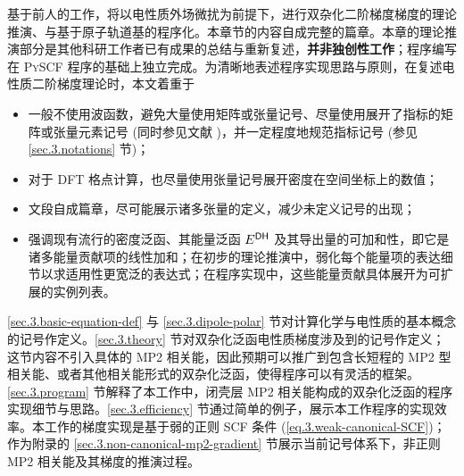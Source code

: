 基于前人的工作\cite{Gerratt-Mills.JCP.1968, Gerratt-Mills.JCP.1968a, Pople-Binkley.IJQC.1979, Dykstra-Jasien.CPL.1984, Handy-Schaefer.JCP.1984, Handy-Simandiras.CPL.1985, Pulay-Saeboe.TCA.1986, Trucks-Bartlett.CPL.1988, Frisch-Pople.CP.1990, Frisch-Pople.CPL.1990, Frisch-Pople.CPL.1990a, Gauss-Bartlett.JCP.1992, Stanton-Bartlett.CPL.1992, Johnson-Frisch.CPL.1993, Head-Gordon-Head-Gordon.CPL.1994, Yamaguchi-Schaefer.Oxford.1994, Weigend-Haeser.TCA.1997, Aikens-Gordon.TCA.2003, Cammi-Frisch.TCA.2004, Distasio-Head-Gordon.JCC.2007, Neese-Grimme.JCP.2007, Biczysko-Barone.JCTC.2010, Su-Xu.JCC.2013, Ji-Jung.JCTC.2013, Bykov-Neese.MP.2015, Stoychev-Neese.JCTC.2018, Yan-Xu.JCTC.2022}，将以电性质外场微扰为前提下，进行双杂化二阶梯度梯度的理论推演、与基于原子轨道基的程序化。本章节的内容自成完整的篇章。本章的理论推演部分是其他科研工作者已有成果的总结与重新复述，\textbf{并非独创性工作}；程序编写在 \textsc{PySCF} 程序的基础上独立完成。为清晰地表述程序实现思路与原则，在复述电性质二阶梯度理论时，本文着重于
\begin{itemize}[nosep]
    \item 一般不使用波函数，避免大量使用矩阵或张量记号、尽量使用展开了指标的矩阵或张量元素记号 (同时参见文献 )，并一定程度地规范指标记号 (参见 \ref{sec.3.notations} 节)；
    \item 对于 DFT 格点计算，也尽量使用张量记号展开密度在空间坐标上的数值；
    \item 文段自成篇章，尽可能展示诸多张量的定义，减少未定义记号的出现；
    \item 强调现有流行的密度泛函、其能量泛函 $E^{\textsf{DH}}$ 及其导出量的可加和性，即它是诸多能量贡献项的线性加和；在初步的理论推演中，弱化每个能量项的表达细节以求适用性更宽泛的表达式；在程序实现中，这些能量贡献具体展开为可扩展的实例列表。
\end{itemize}
\ref{sec.3.basic-equation-def} 与 \ref{sec.3.dipole-polar} 节对计算化学与电性质的基本概念的记号作定义。\ref{sec.3.theory} 节对双杂化泛函电性质梯度涉及到的记号作定义；这节内容不引入具体的 MP2 相关能，因此预期可以推广到包含长短程的 MP2 型相关能、或者其他相关能形式的双杂化泛函，使得程序可以有灵活的框架。\ref{sec.3.program} 节解释了本工作中，闭壳层 MP2 相关能构成的双杂化泛函的程序实现细节与思路。\ref{sec.3.efficiency} 节通过简单的例子，展示本工作程序的实现效率。本工作的梯度实现是基于弱的正则 SCF 条件 (\ref{eq.3.weak-canonical-SCF})；作为附录的 \ref{sec.3.non-canonical-mp2-gradient} 节展示当前记号体系下，非正则 MP2 相关能及其梯度的推演过程。



